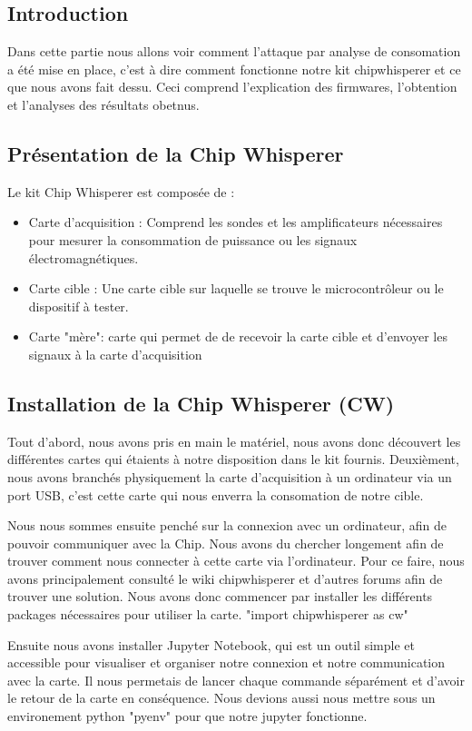 \subsection{Introduction}
Dans cette partie nous allons voir comment l'attaque par analyse de consomation a été mise en place, c'est à dire comment fonctionne notre kit chipwhisperer et ce que nous avons fait dessu. Ceci comprend l'explication des firmwares, l'obtention et l'analyses des résultats obetnus.
\subsection{Présentation de la Chip Whisperer}
Le kit Chip Whisperer est composée de :

\begin{itemize}
\item Carte d'acquisition : Comprend les sondes et les amplificateurs nécessaires pour mesurer la consommation de puissance ou les signaux électromagnétiques.
\item Carte cible : Une carte cible sur laquelle se trouve le microcontrôleur ou le dispositif à tester.
\item Carte "mère": carte qui permet de de recevoir la carte cible et d'envoyer les signaux à la carte d'acquisition
\end{itemize}

\subsection{Installation de la Chip Whisperer (CW)}
Tout d'abord, nous avons pris en main le matériel, nous avons donc découvert les différentes cartes qui étaients à notre disposition dans le kit fournis.
Deuxièment, nous avons branchés physiquement la carte d'acquisition à un ordinateur via un port USB, c'est cette carte qui nous enverra la consomation de notre cible.


Nous nous sommes ensuite penché sur la connexion avec un ordinateur, afin de pouvoir communiquer avec la Chip. Nous avons du chercher longement afin de trouver comment nous connecter à cette carte via l'ordinateur. Pour ce faire, nous avons principalement consulté le wiki chipwhisperer et d'autres forums afin de trouver une solution. 
Nous avons donc commencer par installer les différents packages nécessaires pour utiliser la carte. 
"import chipwhisperer as cw"

Ensuite nous avons installer Jupyter Notebook, qui est un outil simple et accessible pour visualiser et organiser notre connexion et notre communication avec la carte. 
Il nous permetais de lancer chaque commande séparément et d'avoir le retour de la carte en conséquence.
Nous devions aussi nous mettre sous un environement python "pyenv" pour que notre jupyter fonctionne.
